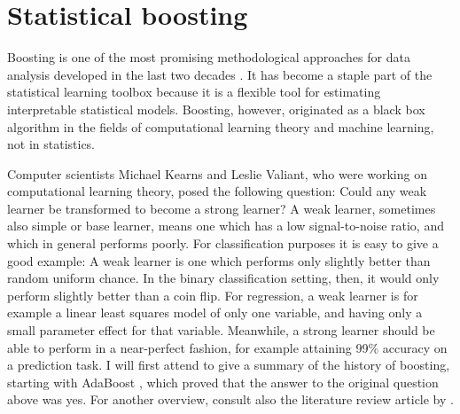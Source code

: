 \chapter{Statistical boosting}
Boosting is one of the most promising methodological approaches for data analysis developed in the last two decades \citep{mayr14a}. It has become a staple part of the statistical learning toolbox because it is a flexible tool for estimating interpretable statistical models. Boosting, however, originated as a black box algorithm in the fields of computational learning theory and machine learning, not in statistics.

Computer scientists Michael Kearns and Leslie Valiant, who were working on computational learning theory, posed the following question: Could any weak learner be transformed to become a strong learner? \citep{kearnsvaliant} A weak learner, sometimes also simple or base learner, means one which has a low signal-to-noise ratio, and which in general performs poorly. For classification purposes it is easy to give a good example: A weak learner is one which performs only slightly better than random uniform chance. In the binary classification setting, then, it would only perform slightly better than a coin flip. For regression, a weak learner is for example a linear least squares model of only one variable, and having only a small parameter effect for that variable. Meanwhile, a strong learner should be able to perform in a near-perfect fashion, for example attaining 99\% accuracy on a prediction task. I will first attend to give a summary of the history of boosting, starting with AdaBoost \citep{adaboost}, which proved that the answer to the original question above was yes. For another overview, consult also the literature review article by \citet{mayr14a}.

